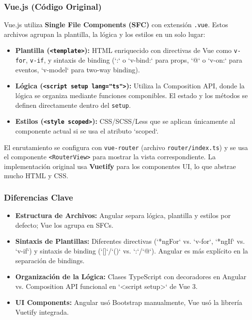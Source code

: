 \documentclass[11pt, a4paper]{article}
\begin{document}
\subsubsection{Vue.js (Código Original)}
Vue.js utiliza \textbf{Single File Components (SFC)} con extensión \texttt{.vue}. Estos archivos agrupan la plantilla, la lógica y los estilos en un solo lugar:
\begin{itemize}
    \item \textbf{Plantilla (\texttt{<template>}):} HTML enriquecido con directivas de Vue como \texttt{v-for}, \texttt{v-if}, y sintaxis de binding (`:` o `v-bind:` para props, `@` o `v-on:` para eventos, `v-model` para two-way binding).
    \item \textbf{Lógica (\texttt{<script setup lang="ts">}):} Utiliza la Composition API, donde la lógica se organiza mediante funciones componibles. El estado y los métodos se definen directamente dentro del \texttt{setup}.
    \item \textbf{Estilos (\texttt{<style scoped>}):} CSS/SCSS/Less que se aplican únicamente al componente actual si se usa el atributo `scoped`.
\end{itemize}
El enrutamiento se configura con \texttt{vue-router} (archivo \texttt{router/index.ts}) y se usa el componente \texttt{<RouterView>} para mostrar la vista correspondiente. La implementación original usa \textbf{Vuetify} para los componentes UI, lo que abstrae mucho HTML y CSS.

\subsubsection{Diferencias Clave}
\begin{itemize}
    \item \textbf{Estructura de Archivos:} Angular separa lógica, plantilla y estilos por defecto; Vue los agrupa en SFCs.
    \item \textbf{Sintaxis de Plantillas:} Diferentes directivas (`*ngFor` vs. `v-for`, `*ngIf` vs. `v-if`) y sintaxis de binding (`[]`/`()` vs. `:`/`@`). Angular es más explícito en la separación de bindings.
    \item \textbf{Organización de la Lógica:} Clases TypeScript con decoradores en Angular vs. Composition API funcional en `<script setup>` de Vue 3.
    \item \textbf{UI Components:} Angular usó Bootstrap manualmente, Vue usó la librería Vuetify integrada.
\end{itemize}
\end{document}
